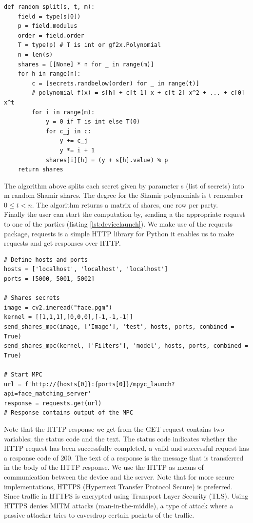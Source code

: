 \begin{lstlisting}[caption={Shamir secret sharing algorithm (part of MPyC framework)}, label={lst:ssss}, frame=single, breaklines=true]
def random_split(s, t, m):
    field = type(s[0])
    p = field.modulus
    order = field.order
    T = type(p) # T is int or gf2x.Polynomial
    n = len(s)
    shares = [[None] * n for _ in range(m)]
    for h in range(n):
        c = [secrets.randbelow(order) for _ in range(t)]
        # polynomial f(x) = s[h] + c[t-1] x + c[t-2] x^2 + ... + c[0] x^t
        for i in range(m):
            y = 0 if T is int else T(0)
            for c_j in c:
                y += c_j
                y *= i + 1
            shares[i][h] = (y + s[h].value) % p
    return shares
\end{lstlisting}

The algorithm above splits each secret given by parameter s (list of secrets) into m random Shamir shares. The degree for the Shamir polynomials is t remember  $0 \leq t < n$. The algorithm returns a matrix of shares, one row per party.\\

Finally the user can start the computation by, sending a the appropriate request to one of the parties (listing \ref{lst:devicelaunch}). We make use of the requests package, requests is a simple HTTP library for Python it enables us to make requests and get responses over HTTP.

\begin{lstlisting}[caption={Sending request for secure face matching task}, label={lst:devicelaunch}, frame=single, breaklines=true]
# Define hosts and ports
hosts = ['localhost', 'localhost', 'localhost']
ports = [5000, 5001, 5002]

# Shares secrets
image = cv2.imeread("face.pgm")
kernel = [[1,1,1],[0,0,0],[-1,-1,-1]]
send_shares_mpc(image, ['Image'], 'test', hosts, ports, combined = True)
send_shares_mpc(kernel, ['Filters'], 'model', hosts, ports, combined = True)

# Start MPC
url = f'http://{hosts[0]}:{ports[0]}/mpyc_launch?api=face_matching_server'
response = requests.get(url)
# Response contains output of the MPC
\end{lstlisting}

Note that the HTTP response we get from the GET request contains two variables; the status code and the text. The status code indicates whether the HTTP request has been  successfully completed, a valid and successful request has a response code of 200. The text of a response is the message that is transferred in the body of the HTTP response. We use the HTTP as means of communication between the device and the server. Note that for more secure implementations, HTTPS (Hypertext Transfer Protocol Secure) is preferred. Since traffic in HTTPS is encrypted using Transport Layer Security (TLS). Using HTTPS denies MITM attacks (man-in-the-middle), a type of attack where a passive attacker tries to eavesdrop certain packets of the traffic.\\

